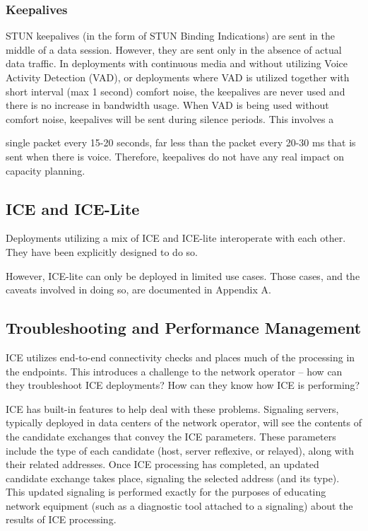 \documentclass{article}
\begin{document}
\subsubsection{Keepalives}

STUN keepalives (in the form of STUN Binding Indications) are sent in the middle of a data session.  However, they are sent only in the absence of actual data traffic.  In deployments with continuous media and without utilizing Voice Activity Detection (VAD), or deployments where VAD is utilized together with short interval (max 1 second) comfort noise, the keepalives are never used and there is no increase in bandwidth usage.  When VAD is being used without comfort noise, keepalives will be sent during silence periods.  This involves a

single packet every 15-20 seconds, far less than the packet every 20-30 ms that is sent when there is voice.  Therefore, keepalives do not have any real impact on capacity planning.

\subsection{ICE and ICE-Lite}

Deployments utilizing a mix of ICE and ICE-lite interoperate with each other.  They have been explicitly designed to do so.

However, ICE-lite can only be deployed in limited use cases.  Those cases, and the caveats involved in doing so, are documented in Appendix A.

\subsection{Troubleshooting and Performance Management}

ICE utilizes end-to-end connectivity checks and places much of the processing in the endpoints.  This introduces a challenge to the network operator -- how can they troubleshoot ICE deployments?  How can they know how ICE is performing?

ICE has built-in features to help deal with these problems. Signaling servers, typically deployed in data centers of the network operator, will see the contents of the candidate exchanges that convey the ICE parameters.  These parameters include the type of each candidate (host, server reflexive, or relayed), along with their related addresses.  Once ICE processing has completed, an updated candidate exchange takes place, signaling the selected address (and its type).  This updated signaling is performed exactly for the purposes of educating network equipment (such as a diagnostic tool attached to a signaling) about the results of ICE processing.
\end{document}
